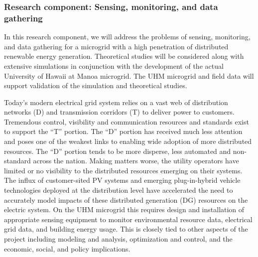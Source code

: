 
\subsubsection{Research component: Sensing, monitoring, and data gathering}
\label{sec:sensing}

In this research component, we will address the problems of sensing,
monitoring, and data gathering for a microgrid with a high penetration of
distributed renewable energy generation.  Theoretical studies will be
considered along with extensive simulations in conjunction with the
development of the actual University of Hawaii at Manoa microgrid.  The UHM
microgrid and field data will support validation of the simulation and
theoretical studies.

Today's modern electrical grid system relies on a vast web of distribution
networks (D) and transmission corridors (T) to deliver power to customers.
Tremendous control, visibility and communication resources and standards
exist to support the ``T'' portion.  The ``D'' portion has received much
less attention and poses one of the weakest links to enabling wide adoption
of more distributed resources.  The ``D'' portion tends to be more
disperse, less automated and non-standard across the nation.  Making
matters worse, the utility operators have limited or no visibility to the
distributed resources emerging on their systems.  The influx of
customer-sited PV systems and emerging plug-in-hybrid vehicle technologies
deployed at the distribution level have accelerated the need to accurately
model impacts of these distributed generation (DG) resources on the
electric system.  On the UHM microgrid this requires design and
installation of appropriate sensing equipment to monitor environmental
resource data, electrical grid data, and building energy usage.  This is
closely tied to other aspects of the project including modeling and
analysis, optimization and control, and the economic, social, and policy
implications.
 
